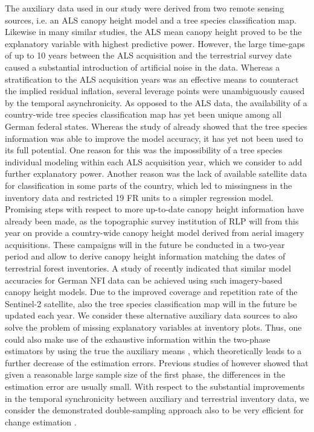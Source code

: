 The auxiliary data used in our study were derived from two remote sensing sources, i.e. an ALS canopy height model and a tree species classification map. Likewise in many similar studies, the ALS mean canopy height proved to be the explanatory variable with highest predictive power. However, the large time-gaps of up to 10 years between the ALS acquisition and the terrestrial survey date caused a substantial introduction of artificial noise in the data. Whereas a stratification to the ALS acquisition years was an effective means to counteract the implied residual inflation, several leverage points were unambiguously caused by the temporal asynchronicity. As opposed to the ALS data, the availability of a country-wide tree species classification map has yet been unique among all German federal states. Whereas the study of \citet{hill2017a} already showed that the tree species information was able to improve the model accuracy, it has yet not been used to its full potential. One reason for this was the impossibility of a tree species individual modeling within each ALS acquisition year, which we consider to add further explanatory power. Another reason was the lack of available satellite data for classification in some parts of the country, which led to missingness in the inventory data and restricted 19 FR units to a simpler regression model. Promising steps with respect to more up-to-date canopy height information have already been made, as the topographic survey institution of RLP will from this year on provide a country-wide canopy height model derived from aerial imagery acquisitions. These campaigns will in the future be conducted in a two-year period and allow to derive canopy height information matching the dates of terrestrial forest inventories. A study of \citet{kirchhoefer2017} recently indicated that similar model accuracies for German NFI data can be achieved using such imagery-based canopy height models. Due to the improved coverage and repetition rate of the Sentinel-2 satellite, also the tree species classification map will in the future be updated each year. We consider these alternative auxiliary data sources to also solve the problem of missing explanatory variables at inventory plots. Thus, one could also make use of the exhaustive information within the two-phase estimators by using the true the auxiliary means \citep{mandallaz2013a, mandallaz2013b}, which theoretically leads to a further decrease of the estimation errors. Previous studies of \citet{mandallaz2013b} however showed that given a reasonable large sample size of the first phase, the differences in the estimation error are usually small. With respect to the substantial improvements in the temporal synchronicity between auxiliary and terrestrial inventory data, we consider the demonstrated double-sampling approach also to be very efficient for change estimation \citep{massey2015b}.\par




